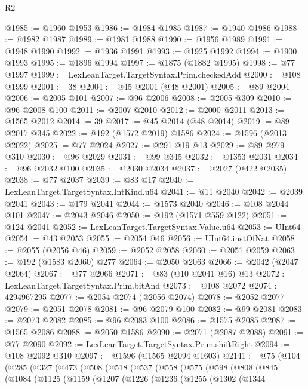 \begin{lexlean}{R2}
\begin{coremodule}
@1985 := @1960 @1953
@1986 := @1984 @1985
@1987 := @1940 @1986
@1988 := @1982 @1987
@1989 := @1981 @1988
@1990 := @1956 @1989
@1991 := @1948 @1990
@1992 := @1936 @1991
@1993 := @1925 @1992
@1994 := @1900 @1993
@1995 := @1896 @1994
@1997 := @1875 (@1882 @1995)
@1998 := @77 @1997
@1999 := LexLeanTarget.TargetSyntax.Prim.checkedAdd
@2000 := @108 @1999
@2001 := 38
@2004 := @45 @2001 (@48 @2001)
@2005 := @89 @2004
@2006 := @2005 @101
@2007 := @96 @2006
@2008 := @2005 @309
@2010 := @96 @2008 @100
@2011 := @2007 @2010
@2012 := @2000 @2011
@2013 := @1565 @2012
@2014 := 39
@2017 := @45 @2014 (@48 @2014)
@2019 := @89 @2017 @345
@2022 := @192 (@1572 @2019) @1586
@2024 := @1596 (@2013 @2022)
@2025 := @77 @2024
@2027 := @291 @19 @13
@2029 := @89 @979 @310
@2030 := @96 @2029
@2031 := @99 @345
@2032 := @1353 @2031
@2034 := @96 @2032 @100
@2035 := @2030 @2034
@2037 := @2027 (@422 @2035)
@2038 := @77 @2037
@2039 := @83 @17
@2040 := LexLeanTarget.TargetSyntax.IntKind.u64
@2041 := @11 @2040
@2042 := @2039 @2041
@2043 := @179 @2041
@2044 := @1573 @2040
@2046 := @108 @2044 @101
@2047 := @2043 @2046
@2050 := @192 (@1571 @559 @122)
@2051 := @124 @2041
@2052 := LexLeanTarget.TargetSyntax.Value.u64
@2053 := UInt64
@2054 := @43 @2053
@2055 := @2054 @46
@2056 := UInt64.instOfNat
@2058 := @2055 (@2056 @46)
@2059 := @2052 @2058
@2060 := @2051 @2059
@2063 := @192 (@1583 @2060) @277
@2064 := @2050 @2063
@2066 := @2042 (@2047 @2064)
@2067 := @77 @2066
@2071 := @83 (@10 @2041 @16) @13
@2072 := LexLeanTarget.TargetSyntax.Prim.bitAnd
@2073 := @108 @2072
@2074 := 4294967295
@2077 := @2054 @2074 (@2056 @2074)
@2078 := @2052 @2077
@2079 := @2051 @2078
@2081 := @96 @2079 @100
@2082 := @99 @2081
@2083 := @2073 @2082
@2085 := @96 @2083 @100
@2086 := @1575 @2085
@2087 := @1565 @2086
@2088 := @2050 @1586
@2090 := @2071 (@2087 @2088)
@2091 := @77 @2090
@2092 := LexLeanTarget.TargetSyntax.Prim.shiftRight
@2094 := @108 @2092 @310
@2097 := @1596 (@1565 @2094 @1603)
@2141 := @75
    (@104
      (@285
        (@327
          (@473
            (@508
              (@518
                (@537
                  (@558
                    (@575
                      (@598
                        (@808
                          (@845
                            (@1084
                              (@1125
                                (@1159
                                  (@1207
                                    (@1226
                                      (@1236
                                        (@1255
                                          (@1302
                                            (@1344

\end{coremodule}
\end{lexlean}
